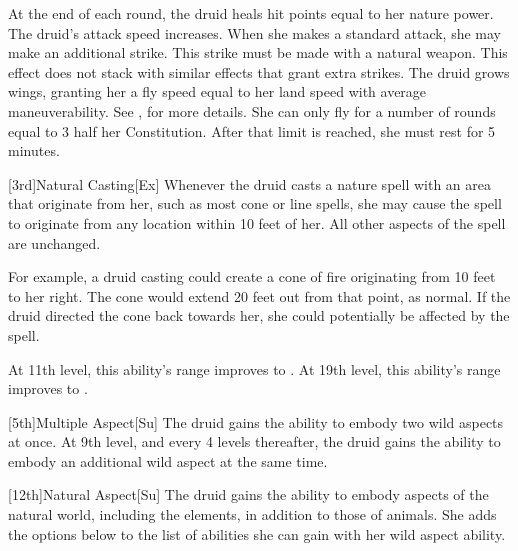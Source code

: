     At the end of each round, the druid heals hit points equal to her nature power.
    The druid's attack speed increases.
    When she makes a standard attack, she may make an additional strike.
    This strike must be made with a natural weapon.
    This effect does not stack with similar effects that grant extra strikes.
    The druid grows wings, granting her a fly speed equal to her land speed with average maneuverability.
    See , for more details.
    She can only fly for a number of rounds equal to 3 \add half her Constitution.
    After that limit is reached, she must rest for 5 minutes.

[3rd]{Natural Casting}[Ex]
Whenever the druid casts a nature spell with an area that originate from her, such as most cone or line spells, she may cause the spell to originate from any location within 10 feet of her.
All other aspects of the spell are unchanged.

For example, a druid casting  could create a cone of fire originating from 10 feet to her right.
The cone would extend 20 feet out from that point, as normal.
If the druid directed the cone back towards her, she could potentially be affected by the spell.

At 11th level, this ability's range improves to \rngclose.
At 19th level, this ability's range improves to \rngmed.

[5th]{Multiple Aspect}[Su]
The druid gains the ability to embody two wild aspects at once.
At 9th level, and every 4 levels thereafter, the druid gains the ability to embody an additional wild aspect at the same time.

[12th]{Natural Aspect}[Su]
The druid gains the ability to embody aspects of the natural world, including the elements, in addition to those of animals.
She adds the options below to the list of abilities she can gain with her wild aspect ability.

